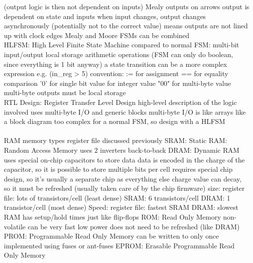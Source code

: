 \documentclass{article}
\begin{document}
\begin{multicols*}{2}
\begin{outline}[compactitem]
\3             (output logic is then not dependent on inputs)
\1     Mealy
\2         outputs on arrows
\2         output is dependent on state and inputs
\3             when input changes, output changes asynchronously
\3             (potentially not to the correct value)
\2         means outputs are not lined up with clock edges
\2         Mealy and Moore FSMs can be combined
\noindent \\ 
\0 HLFSM: High Level Finite State Machine
\1     compared to normal FSM:
\2         multi-bit input/output
\2         local storage
\2         arithmetic operations
\3             (FSM can only do boolean, since everything is 1 bit anyway)
\2         a state transition can be a more complex expression
\3             e.g. (in\_reg > 5)
\1     convention:
\2         := for assignment
\2         == for equality comparison
\2         '0' for single bit value
 for integer value
\2         "00" for multi-byte value
\3             multi-byte outputs must be local storage
\noindent \\ 
\0 RTL Design: Register Transfer Level Design
\1     high-level description of the logic involved
\1     uses multi-byte I/O and generic blocks
\2         multi-byte I/O is like arrays
\1     like a block diagram
\2         too complex for a normal FSM, so design with a HLFSM
\noindent \\ 
\noindent \\ 
\0 RAM memory types
\1     register file
\2         discussed previously
\1     SRAM: Static RAM: Random Access Memory
\2         uses 2 inverters back-to-back
\1     DRAM: Dynamic RAM
\2         uses special on-chip capacitors to store data
\2         data is encoded in the charge of the capacitor, so it is possible to store multiple bits per cell
\2         requires special chip design, so it's usually a separate chip as everything else
\2         charge value can decay, so it must be refreshed
\3             (usually taken care of by the chip firmware)
\1     size:
\2         register file: lots of transistors/cell (least dense)
\2         SRAM: 6 transistors/cell
\2         DRAM: 1 transistor/cell (most dense)
\1     Speed:
\2         register file: fastest
\2         SRAM
\2         DRAM: slowest
\1     RAM has setup/hold times just like flip-flops
\0 ROM: Read Only Memory
\1     non-volatile
\1     can be very fast
\1     low power
\1     does not need to be refreshed (like DRAM)
\1     PROM: Programmable Read Only Memory
\2         can be written to only once
\2         implemented using fuses or ant-fuses
\1     EPROM: Erasable Programmable Read Only Memory

\end{outline}
\end{multicols*}
\end{document}
